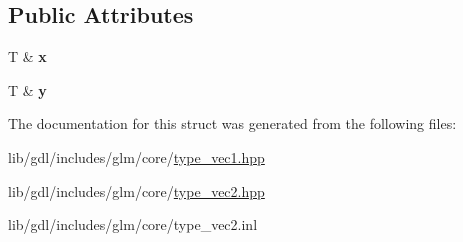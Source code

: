 \subsection*{Public Attributes}
\begin{DoxyCompactItemize}
\item 
\hypertarget{structglm_1_1detail_1_1tref2_af28062fb8ed711515c0beb853a8a968f}{}T \& {\bfseries x}\label{structglm_1_1detail_1_1tref2_af28062fb8ed711515c0beb853a8a968f}

\item 
\hypertarget{structglm_1_1detail_1_1tref2_af2a3e1e998dac26176c0e26ffb9365be}{}T \& {\bfseries y}\label{structglm_1_1detail_1_1tref2_af2a3e1e998dac26176c0e26ffb9365be}

\end{DoxyCompactItemize}


The documentation for this struct was generated from the following files\+:\begin{DoxyCompactItemize}
\item 
lib/gdl/includes/glm/core/\hyperlink{type__vec1_8hpp}{type\+\_\+vec1.\+hpp}\item 
lib/gdl/includes/glm/core/\hyperlink{type__vec2_8hpp}{type\+\_\+vec2.\+hpp}\item 
lib/gdl/includes/glm/core/type\+\_\+vec2.\+inl\end{DoxyCompactItemize}

